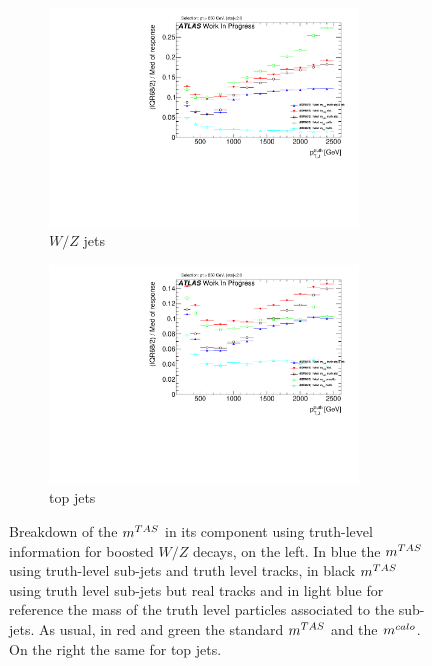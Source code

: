 
\begin{figure}
    \centering
    \begin{subfigure}[b]{0.45\textwidth}
  \centering
      \includegraphics[width=0.9\textwidth]{jet_part/calib/71graphcftr_h_JetRatio_mJ12CALOIQRoM4Truths.pdf}
  \caption[Breakdown of the $\mtas$ ]{$W/Z$ jets}
  \label{fig:breakdown2}
    \end{subfigure}
    \begin{subfigure}[b]{0.45\textwidth}
  \centering
      \includegraphics[width=0.9\textwidth]{jet_part/appendixA/71graphcftr_h_JetRatio_mJ12CALOIQRoM4TruthsTops.pdf}
  \caption[Breakdown of the $\mtas$ ]{top jets}
  \label{fig:breakdown3}
 
    \end{subfigure}
    \caption[Breakdown of the $\mtas$]{Breakdown of the $\mtas$ in its component using truth-level information for boosted $W/Z$ decays, on the left. In blue the $\mtas$ using truth-level sub-jets and truth level tracks, in black $\mtas$ using truth level sub-jets but real tracks and in light blue for reference the mass of the truth level particles associated to the sub-jets. As usual, in red and green the standard $\mtas$ and the $m^{calo}$. On the right the same for top jets.} 
\end{figure}

